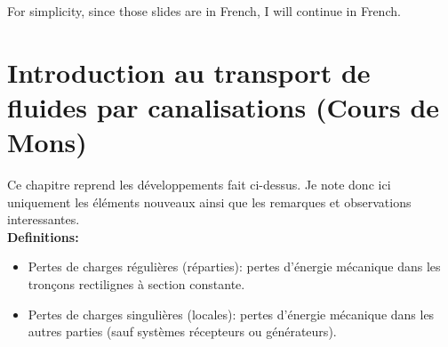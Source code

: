 For simplicity, since those slides are in French, I will continue in French.

\section{Introduction au transport de fluides par canalisations (Cours de Mons)}

Ce chapitre reprend les développements fait ci-dessus. Je note donc ici uniquement les éléments nouveaux ainsi que les remarques et observations interessantes.\\

\textbf{Definitions:}
\begin{itemize}
\item Pertes de charges régulières (réparties): pertes d'énergie mécanique dans les tronçons rectilignes à section constante.
\item Pertes de charges singulières (locales): pertes d'énergie mécanique dans les autres parties (sauf systèmes récepteurs ou générateurs).
\end{itemize}


